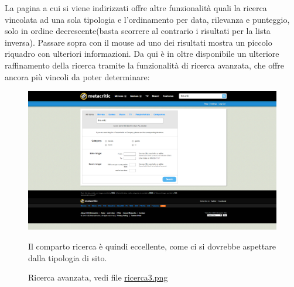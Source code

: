 \documentclass[12pt]{article}
\begin{document}
La pagina a cui si viene indirizzati offre altre funzionalità quali la ricerca vincolata ad una sola tipologia e l'ordinamento per data, rilevanza e punteggio, solo in ordine decrescente(basta scorrere al contrario i risultati per la lista inversa).
Passare sopra con il mouse ad uno dei risultati mostra un piccolo riquadro con ulteriori informazioni.
Da qui è in oltre disponibile un ulteriore raffinamento della ricerca tramite la funzionalità di ricerca avanzata, che offre ancora più vincoli da poter determinare:
\begin{figure}[H]
\begin{center}
	\includegraphics[width=13.5cm]{ricerca3.png}
	\caption{Ricerca avanzata, vedi file \href{ricerca3.png}{ricerca3.png}}
\end{center}
Il comparto ricerca è quindi eccellente, come ci si dovrebbe aspettare dalla tipologia di sito.
\end{figure}
\newpage
\end{document}
